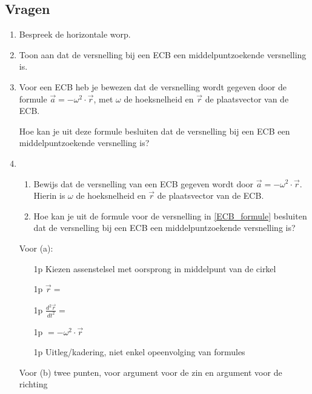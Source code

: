 





\subsection{Vragen}

\begin{enumerate}


{kin_theorie_I_1} %

{2d_abstract_1}
{2d_abstract_I_2}

{2d_I_1} %
{2d_I_2} %

{dyn_ECB_I_1} %




\item Bespreek de horizontale worp.

\item Toon aan dat de versnelling bij een ECB een middelpuntzoekende versnelling is.

\item Voor een ECB heb je bewezen dat de versnelling wordt gegeven door de formule $\vec{a}=-\omega^2\cdot\vec{r}$, met $\omega$ de hoeksnelheid en $\vec{r}$ de plaatsvector van de ECB. 

Hoe kan je uit deze formule besluiten dat de versnelling bij een ECB een middelpuntzoekende versnelling is?

\item
\begin{enumerate}
	\item\label{ECB_formule} Bewijs dat de versnelling van een ECB gegeven wordt door $\vec{a}=-\omega^2\cdot\vec{r}$. Hierin is $\omega$ de hoeksnelheid en $\vec{r}$ de plaatsvector van de ECB.
	\item Hoe kan je uit de formule voor de versnelling in \ref{ECB_formule} besluiten dat de versnelling bij een ECB een middelpuntzoekende versnelling is?
\end{enumerate}

\begin{oplossing}
Voor (a):
	\begin{enumerate}
		\item[1p] Kiezen assenstelsel met oorsprong in middelpunt van de cirkel
		\item[1p] $\vec{r}=$
		\item[1p] $\frac{d^2 \vec{r}}{dt^2}=$
		\item[1p] $=-\omega^2\cdot\vec{r} $
		\item[1p] Uitleg/kadering, niet enkel opeenvolging van formules
	\end{enumerate}
Voor (b) twee punten, voor argument voor de zin en argument voor de richting
\end{oplossing}


\end{enumerate}
